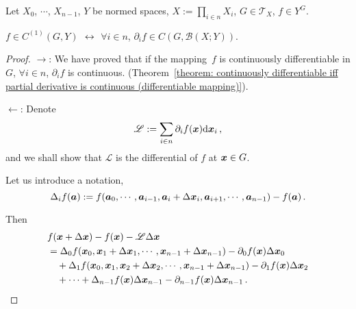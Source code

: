 \documentclass[openany]{book}
\begin{document}
\begin{theorem}
	\label{theorem: continuously differentiable iff partial differential is continuous}
	Let $X_0$, $\cdots$, $X_{n-1}$, $Y$ be normed spaces, $X := \prod_{i \in n} X_i$, $G \in \mathscr T_X$, $f \in Y^G$.

	$f \in C^{(1)}(G, Y)$ $\;\leftrightarrow\;$ $\forall i \in n$, $\partial_i f \in C(G, \mathcal B(X; Y))$.
\end{theorem}
\begin{proof}
	$\to$: 
	We have proved that if the mapping~$f$ is continuously differentiable in $G$, $\forall i \in n$, $\partial_i f$ is continuous. (Theorem~\ref{theorem: continuously differentiable iff partial derivative is continuous (differentiable mapping)}).

	$\gets$:
	Denote
	\begin{equation*}
		\mathscr L := \sum_{i \in n} \partial_i f(\boldsymbol{x}) \mathrm{d} \boldsymbol{x}_i\,,
	\end{equation*}
	and we shall show that $\mathscr L$ is the differential of $f$ at $\boldsymbol{x} \in G$.

	Let us introduce a notation, 
	\begin{equation*}
		\Delta_i f(\boldsymbol{a}) := f(\boldsymbol{a}_0, \cdots, \boldsymbol{a}_{i-1}, \boldsymbol{a}_i + \Delta \boldsymbol{x}_i, \boldsymbol{a}_{i+1}, \cdots, \boldsymbol{a}_{n-1}) - f(\boldsymbol{a})\,.
	\end{equation*}

	Then
	\begin{align*}
		&f(\boldsymbol{x} + \Delta \boldsymbol{x}) - f(\boldsymbol{x}) - \mathscr L \Delta \boldsymbol{x} 
		\\
		&= \Delta_0 f(\boldsymbol{x}_0, \boldsymbol{x}_1 + \Delta \boldsymbol{x}_1, \cdots, \boldsymbol{x}_{n-1} + \Delta \boldsymbol{x}_{n-1}) - \partial_0 f(\boldsymbol{x})\Delta \boldsymbol{x}_0
		\\
		&\quad + \Delta_1 f(\boldsymbol{x}_0, \boldsymbol{x}_1, \boldsymbol{x}_2 + \Delta \boldsymbol{x}_2, \cdots, \boldsymbol{x}_{n-1} + \Delta \boldsymbol{x}_{n-1}) 
			- \partial_1 f(\boldsymbol{x}) \Delta \boldsymbol{x}_2
		\\
		&\quad + \cdots 
		 + \Delta_{n-1} f(\boldsymbol{x}) \Delta \boldsymbol{x}_{n-1} - \partial_{n-1} f(\boldsymbol{x}) \Delta \boldsymbol{x}_{n-1}
		\,.
	\end{align*}


\end{proof}
\end{document}
